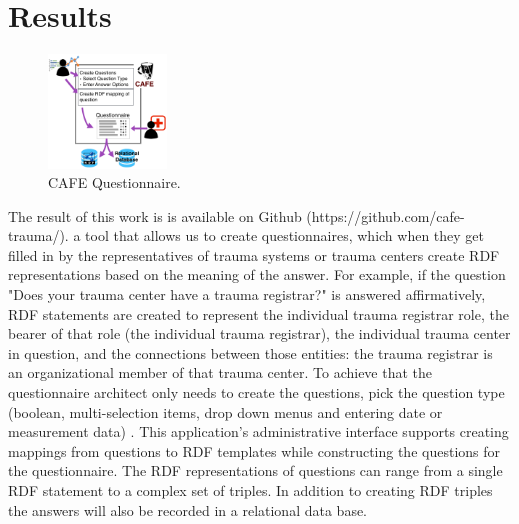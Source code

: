 \documentclass{amia}
\begin{document}
\section*{Results}
\begin{figure}
  \begin{center}
    \includegraphics[width=0.28\textwidth]{pics/cafe_process5.png}
  \end{center}
  \caption{CAFE Questionnaire.}
  \label{cafe_process}
\end{figure}

The result of this work is is available on Github (https://github.com/cafe-trauma/). 
a tool that allows us to create questionnaires, which when they get filled in by the representatives of trauma systems or trauma centers create RDF representations based on the meaning of the answer. 
For example, if the question "Does your trauma center have a trauma registrar?" is answered affirmatively, RDF statements are created to represent the individual trauma registrar role, the bearer of that role (the individual trauma registrar), the individual trauma center in question, and the connections between those entities: the trauma registrar is an organizational member of that trauma center.
To achieve that the questionnaire architect only needs to create the questions, pick the question type (boolean, multi-selection items, drop down menus and entering date or measurement data) .
This application's administrative interface supports creating mappings from questions to RDF templates while constructing the questions for the questionnaire. 
The RDF representations of questions can range from a single RDF statement to a complex set of triples.
In addition to creating RDF triples the answers will  also be recorded in a relational data base.
\end{document}

